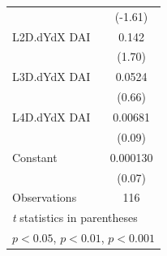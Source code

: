 {\begin{tabular}{l*{1}{c}}
                    &     (-1.61)         \\
\addlinespace
L2D.dYdX DAI        &       0.142         \\
                    &      (1.70)         \\
\addlinespace
L3D.dYdX DAI        &      0.0524         \\
                    &      (0.66)         \\
\addlinespace
L4D.dYdX DAI        &     0.00681         \\
                    &      (0.09)         \\
\addlinespace
Constant            &    0.000130         \\
                    &      (0.07)         \\
\midrule
Observations        &         116         \\
\bottomrule
\multicolumn{2}{l}{\footnotesize \textit{t} statistics in parentheses}\\
\multicolumn{2}{l}{\footnotesize \sym{*} \(p<0.05\), \sym{**} \(p<0.01\), \sym{***} \(p<0.001\)}\\
\end{tabular}
}
